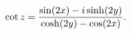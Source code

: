 \[\mathop{\cot\/}\nolimits z=\frac{\mathop{\sin\/}\nolimits\!\left(2x\right)-i%
\mathop{\sinh\/}\nolimits\!\left(2y\right)}{\mathop{\cosh\/}\nolimits\!\left(2%
y\right)-\mathop{\cos\/}\nolimits\!\left(2x\right)}.\]